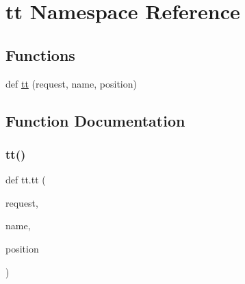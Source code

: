 \hypertarget{namespacett}{}\section{tt Namespace Reference}
\label{namespacett}
\subsection*{Functions}
\begin{DoxyCompactItemize}
\item 
def \hyperlink{namespacett_a07d3230439a7b05c45dbd0f5d2f8515d}{tt} (request, name, position)
\end{DoxyCompactItemize}


\subsection{Function Documentation}
\mbox{\label{namespacett_a07d3230439a7b05c45dbd0f5d2f8515d}} 
\subsubsection{\texorpdfstring{tt()}{tt()}}
{\footnotesize\ttfamily def tt.\+tt (\begin{DoxyParamCaption}\item[{}]{request,  }\item[{}]{name,  }\item[{}]{position }\end{DoxyParamCaption})}

